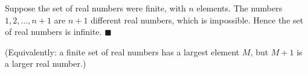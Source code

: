 Suppose the set of real numbers were finite, with $n$ elements. The numbers $1,2,\dots,n+1$ are $n+1$ different real numbers, which is impossible. Hence the set of real numbers is infinite. $\blacksquare$

(Equivalently: a finite set of real numbers has a largest element $M$, but $M+1$ is a larger real number.)

